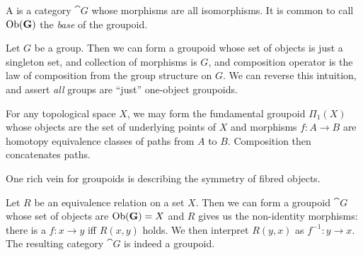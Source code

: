 \begin{node}[Groupoids]\label{cat-000B}%
\begin{definition}\label{cat-000C}%
A  is a category $\cat{G}$ whose morphisms are all
isomorphisms. It is common to call $\operatorname{Ob}(\mathbf{G})$ the \textit{base} of
the groupoid.
\end{definition}

\begin{node}[Examples]\label{cat-000D}%
\begin{node}\label{cat-000I}%
Let $G$ be a group. Then we can form a groupoid whose set of objects is
just a singleton set, and collection of morphisms is $G$, and
composition operator is the law of composition from the group structure
on $G$. We can reverse this intuition, and assert \emph{all} groups are
``just'' one-object groupoids.
\end{node}

\begin{node}\label{cat-000E}%
For any topological space $X$, we may form the fundamental groupoid
$\Pi_{1}(X)$ whose objects are the set of underlying points of $X$ and
morphisms $f\colon A\to B$ are homotopy equivalence classes of paths
from $A$ to $B$.  Composition then concatenates paths.
\end{node}

\begin{node}\label{cat-000Q}%
One rich vein for groupoids is describing the symmetry of fibred objects.
\end{node}

\begin{node}\label{cat-000R}%
Let $R$ be an equivalence relation on a set $X$. Then we can form a
groupoid $\cat{G}$ whose set of objects are $\operatorname{Ob}(\mathbf{G})=X$ and $R$
gives us the non-identity morphisms: there is a $f\colon x\to y$ iff
$R(x,y)$ holds. We then interpret $R(y,x)$ as $f^{-1}\colon y\to x$. The
resulting category $\cat{G}$ is indeed a groupoid.
\end{node}
\end{node}
\end{node}

